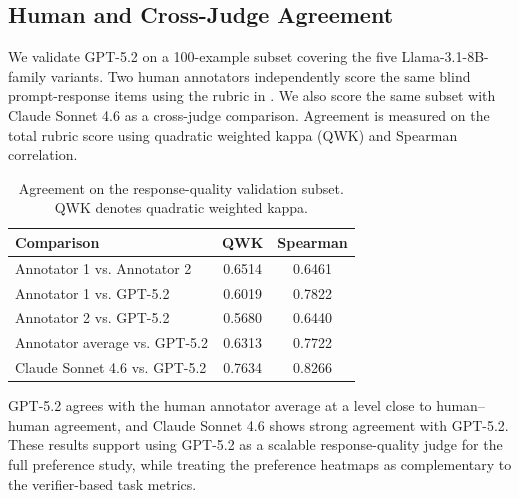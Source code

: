 \subsection{Human and Cross-Judge Agreement}
\label{app:human-gpt-agreement}

We validate GPT-5.2 on a 100-example subset covering the five Llama-3.1-8B-family variants. Two human annotators independently score the same blind prompt-response items using the rubric in . We also score the same subset with Claude Sonnet 4.6 as a cross-judge comparison. Agreement is measured on the total rubric score using quadratic weighted kappa (QWK) and Spearman correlation.

\begin{table}[t]
\centering
\caption{Agreement on the response-quality validation subset. QWK denotes quadratic weighted kappa.}
\label{tab:human-gpt-agreement}
\begin{tabular}{lcc}
\toprule
Comparison & QWK & Spearman \\
\midrule
Annotator 1 vs. Annotator 2      & 0.6514 & 0.6461 \\
Annotator 1 vs. GPT-5.2          & 0.6019 & 0.7822 \\
Annotator 2 vs. GPT-5.2          & 0.5680 & 0.6440 \\
Annotator average vs. GPT-5.2    & 0.6313 & 0.7722 \\
Claude Sonnet 4.6 vs. GPT-5.2    & 0.7634 & 0.8266 \\
\bottomrule
\end{tabular}
\end{table}

GPT-5.2 agrees with the human annotator average at a level close to human--human agreement, and Claude Sonnet 4.6 shows strong agreement with GPT-5.2. These results support using GPT-5.2 as a scalable response-quality judge for the full preference study, while treating the preference heatmaps as complementary to the verifier-based task metrics.
